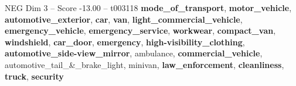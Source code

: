 \begin{textsample}{NEG Dim 3 – Score -13.00 – t003118}  \label{ex:f3_neg_003}
\textbf{mode\_of\_transport}, \textbf{motor\_vehicle}, \textbf{automotive\_exterior}, \textbf{car}, \textbf{van}, \textbf{light\_commercial\_vehicle}, \textbf{emergency\_vehicle}, \textbf{emergency\_service}, \textbf{workwear}, \textbf{compact\_van}, \textbf{windshield}, \textbf{car\_door}, \textbf{emergency}, \textbf{high-visibility\_clothing}, \textbf{automotive\_side-view\_mirror}, ambulance, \textbf{commercial\_vehicle}, automotive\_tail\_\&\_brake\_light, minivan, \textbf{law\_enforcement}, \textbf{cleanliness}, \textbf{truck}, \textbf{security}

\end{textsample}
